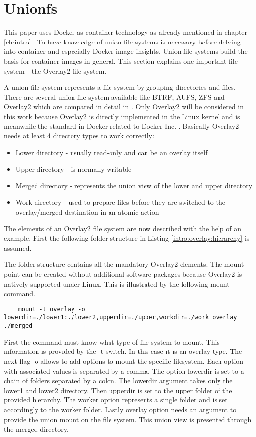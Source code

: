 \section{Unionfs}
\label{sec:intro:docker_image:unionfs}
This paper uses Docker as container technology as already mentioned in chapter \ref{ch:intro} .
To have knowledge of union file systems is necessary before delving into container and especially Docker image insights.
Union file systems build the basis for container images in general. This section explains one important file system - the Overlay2 file system.

A union file system represents a file system by grouping directories and files. There are several union file system available like BTRF, AUFS, ZFS and Overlay2 which are compared in detail in \cite{Tarasov2019}.
Only Overlay2 will be considered in this work because Overlay2 is directly implemented in the Linux kernel \cite{Tarasov2019} and is meanwhile the standard in Docker related to Docker Inc. \cite{docker_storage_driver}.
Basically Overlay2 needs at least 4 directory types to work correctly:
\begin{itemize}
\item Lower directory - usually read-only and can be an overlay itself
\item Upper directory - is normally writable
\item Merged directory - represents the union view of the lower and upper directory
\item Work directory - used to prepare files before they are switched to the overlay/merged destination in an atomic action 
\end{itemize}
The elements of an Overlay2 file system are now described with the help of an example. 
First the following folder structure in Listing \ref{intro:overlay:hierarchy} is assumed.

The folder structure contains all the mandatory Overlay2 elements. The mount point can be created without additional software packages because Overlay2 is natively supported under Linux.
This is illustrated by the following mount command.
\begin{lstlisting}
	mount -t overlay -o lowerdir=./lower1:./lower2,upperdir=./upper,workdir=./work overlay ./merged
\end{lstlisting}
First the command must know what type of file system to mount. This information is provided by the -t switch. In this case it is an overlay type. The next flag -o allows to add options to mount the specific filesystem. Each option with associated values is separated by a comma. The option lowerdir is set to a chain of folders separated by a colon. The lowerdir argument takes only the lower1 and lower2 directory. Then upperdir is set to the upper folder of the provided hierarchy. The worker option represents a single folder and is set accordingly to the worker folder. Lastly overlay option needs an argument to provide the union mount on the file system. This union view is presented through the merged directory.

